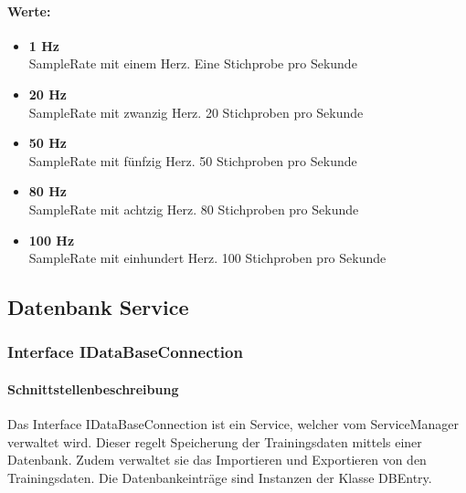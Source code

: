 \documentclass[a4paper,12pt]{article}
\begin{document}
	\paragraph{Werte:}
	\begin{itemize}
		\item \textbf{1 Hz}\\SampleRate mit einem Herz. Eine Stichprobe pro Sekunde
		\item \textbf{20 Hz}\\SampleRate mit zwanzig Herz. 20 Stichproben pro Sekunde
		\item \textbf{50 Hz}\\SampleRate mit fünfzig Herz. 50 Stichproben pro Sekunde
		\item \textbf{80 Hz}\\SampleRate mit achtzig Herz. 80 Stichproben pro Sekunde
		\item \textbf{100 Hz}\\SampleRate mit einhundert Herz. 100 Stichproben pro Sekunde
	\end{itemize}
	
	
	
	
	
	
	
\subsection{Datenbank Service}
\subsubsection{Interface IDataBaseConnection}
	\paragraph{Schnittstellenbeschreibung}
	Das Interface IDataBaseConnection ist ein Service, welcher vom ServiceManager verwaltet wird. Dieser regelt Speicherung der Trainingsdaten mittels einer \gls{Datenbank}. Zudem verwaltet sie das Importieren und Exportieren von den Trainingsdaten.
	Die Datenbankeinträge sind Instanzen der Klasse DBEntry. 
	
\end{document}
